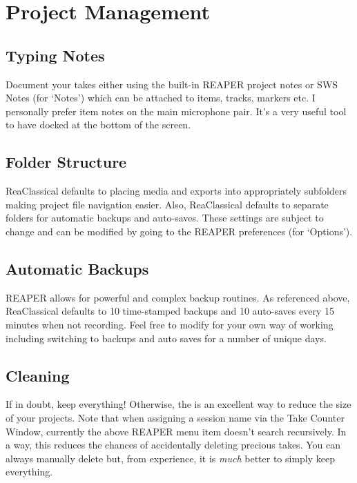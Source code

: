 \documentclass[10pt,american]{article}
\begin{document}
\section{Project Management}

\subsection{Typing Notes}

Document your takes either using the built-in REAPER project notes or SWS Notes
 (for `Notes') which can be attached to items, tracks, markers etc. I
personally prefer item notes on the main microphone pair. It's a very useful
tool to have docked at the bottom of the screen.

\subsection{Folder Structure}

ReaClassical defaults to placing media and exports into appropriately subfolders
making project file navigation easier. Also, ReaClassical defaults to separate
folders for automatic backups and auto-saves. These settings are subject to
change and can be modified by going to the REAPER preferences  (for
`Options').

\subsection{Automatic Backups}

REAPER allows for powerful and complex backup routines. As referenced above,
ReaClassical defaults to 10 time-stamped backups and 10 auto-saves every 15
minutes when not recording. Feel free to modify for your own way of working
including switching to backups and auto saves for a number of unique days.

\subsection{Cleaning}

If in doubt, keep everything! Otherwise, the  is an excellent way to reduce the size of your projects. Note that
when assigning a session name via the Take Counter Window, currently the above
REAPER menu item doesn't search recursively. In a way, this reduces the chances
of accidentally deleting precious takes. You can always manually delete but,
from experience, it is \emph{much} better to simply keep everything.
\end{document}
